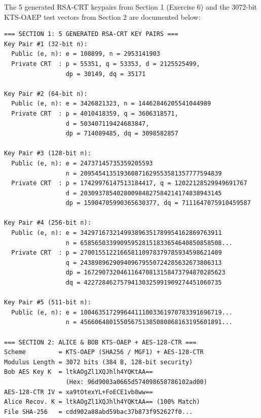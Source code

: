 \documentclass[10pt,twocolumn,letterpaper]{article}
\begin{document}
The 5 generated RSA-CRT keypairs from Section 1 (Exercise 6) and the 3072-bit KTS-OAEP test vectors from Section 2 are documented below:

{\scriptsize
\begin{verbatim}
=== SECTION 1: 5 GENERATED RSA-CRT KEY PAIRS ===
Key Pair #1 (32-bit n):
  Public (e, n): e = 108899, n = 2953141903
  Private CRT  : p = 55351, q = 53353, d = 2125525499,
                 dp = 30149, dq = 35171

Key Pair #2 (64-bit n):
  Public (e, n): e = 3426821323, n = 14462846205541044989
  Private CRT  : p = 4010418359, q = 3606318571,
                 d = 503407119424683847,
                 dp = 714089485, dq = 3098582857

Key Pair #3 (128-bit n):
  Public (e, n): e = 24737145735359205593
                 n = 209545413519360871629553581357777594839
  Private CRT  : p = 17429976147513184417, q = 12022128529949691767
                 d = 203093785402800984827584214174838943145
                 dp = 15904705990365630377, dq = 7111647075910459587

Key Pair #4 (256-bit n):
  Public (e, n): e = 342971673214993896351789954162869763911
                 n = 658565033990959528151833654640850858508...
  Private CRT  : p = 270015512216658110978379785934598621409
                 q = 243898962909409679550724285632673806313
                 dp = 167290732046116470813158473794870285623
                 dq = 42272846275794130325991909274451060735

Key Pair #5 (511-bit n):
  Public (e, n): e = 100463517299644111003361970783391696719...
                 n = 456606480155056751385080868163195601891...

=== SECTION 2: ALICE & BOB KTS-OAEP + AES-128-CTR ===
Scheme         = KTS-OAEP (SHA256 / MGF1) + AES-128-CTR
Modulus Length = 3072 bits (384 B, 128-bit security)
Bob AES Key K  = ltkAOgZl1XQJhlh4YQKtAA==
                 (Hex: 96d9003a0665d574098658786102ad00)
AES-128-CTR IV = xa9tOtexYL+FoECE1vb8ww==
Alice Recov. K = ltkAOgZl1XQJhlh4YQKtAA== (100% Match)
File SHA-256   = cdd902a88abd59bac37b873f952627f0...
\end{verbatim}
}
\end{document}
